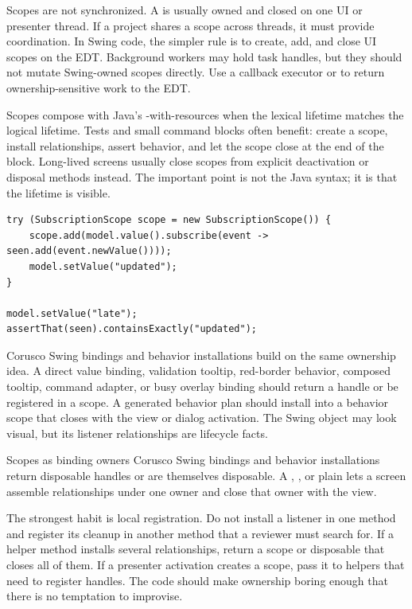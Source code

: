Scopes are not synchronized. A  is usually owned and
closed on one UI or presenter thread. If a project shares a scope across
threads, it must provide coordination. In Swing code, the simpler rule is to
create, add, and close UI scopes on the EDT. Background workers may hold task
handles, but they should not mutate Swing-owned scopes directly. Use a callback
executor or  to return ownership-sensitive work to the
EDT.

Scopes compose with Java's -with-resources when the lexical lifetime
matches the logical lifetime. Tests and small command blocks often benefit:
create a scope, install relationships, assert behavior, and let the scope close
at the end of the block. Long-lived screens usually close scopes from explicit
deactivation or disposal methods instead. The important point is not the Java
syntax; it is that the lifetime is visible.

\begin{lstlisting}[caption={A small test can use lexical scope ownership.}]
try (SubscriptionScope scope = new SubscriptionScope()) {
    scope.add(model.value().subscribe(event -> seen.add(event.newValue())));
    model.setValue("updated");
}

model.setValue("late");
assertThat(seen).containsExactly("updated");
\end{lstlisting}

Corusco Swing bindings and behavior installations build on the same ownership
idea. A direct value binding, validation tooltip, red-border behavior, composed
tooltip, command adapter, or busy overlay binding should return a handle or be
registered in a scope. A generated behavior plan should install into a
behavior scope that closes with the view or dialog activation. The Swing
object may look visual, but its listener relationships are lifecycle facts.

\begin{coruscobox}{Scopes as binding owners}
Corusco Swing bindings and behavior installations return disposable handles or
are themselves disposable. A , , or plain
 lets a screen assemble relationships under one owner
and close that owner with the view.
\end{coruscobox}

The strongest habit is local registration. Do not install a listener in one
method and register its cleanup in another method that a reviewer must search
for. If a helper method installs several relationships, return a scope or
disposable that closes all of them. If a presenter activation creates a scope,
pass it to helpers that need to register handles. The code should make
ownership boring enough that there is no temptation to improvise.

